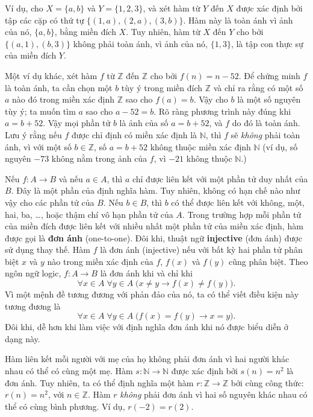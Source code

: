 \begin{example}
Ví dụ, cho $X = \{a,b\}$ và $Y = \{1,2,3\}$, và xét hàm từ $Y$ đến $X$ được xác định bởi tập các cặp có thứ tự $\{(1,a),(2,a),(3,b)\}$. Hàm này là toàn ánh vì ảnh của nó, $\{a,b\}$, bằng miền đích $X$. Tuy nhiên, hàm từ $X$ đến $Y$ cho bởi $\{(a,1),(b,3)\}$ không phải toàn ánh, vì ảnh của nó, $\{1,3\}$, là tập con thực sự của miền đích $Y$.

Một ví dụ khác, xét hàm $f$ từ $\mathbb{Z}$ đến $\mathbb{Z}$ cho bởi $f(n) = n - 52$. Để chứng minh $f$ là toàn ánh, ta cần chọn một $b$ tùy ý trong miền đích $\mathbb{Z}$ và chỉ ra rằng có một số $a$ nào đó trong miền xác định $\mathbb{Z}$ sao cho $f(a) = b$. Vậy cho $b$ là một số nguyên tùy ý; ta muốn tìm $a$ sao cho $a - 52 = b$. Rõ ràng phương trình này đúng khi $a = b + 52$. Vậy mọi phần tử $b$ là ảnh của số $a = b + 52$, và $f$ do đó là toàn ánh. Lưu ý rằng nếu $f$ được chỉ định có miền xác định là $\mathbb{N}$, thì $f$ sẽ \emph{không} phải toàn ánh, vì với một số $b \in \mathbb{Z}$, số $a = b + 52$ không thuộc miền xác định $\mathbb{N}$ (ví dụ, số nguyên $-73$ không nằm trong ảnh của $f$, vì $-21$ không thuộc $\mathbb{N}$.)
\end{example}

Nếu $f\colon A \to B$ và nếu $a \in A$, thì $a$ chỉ được liên kết với một phần tử duy nhất của $B$. Đây là một phần của định nghĩa hàm. Tuy nhiên, không có hạn chế nào như vậy cho các phần tử của $B$. Nếu $b \in B$, thì $b$ có thể được liên kết với không, một, hai, ba, \ldots, hoặc thậm chí vô hạn phần tử của $A$. Trong trường hợp mỗi phần tử của miền đích được liên kết với nhiều nhất một phần tử của miền xác định, hàm được gọi là \textbf{đơn ánh} (one-to-one). Đôi khi, thuật ngữ \textbf{injective} (đơn ánh) được sử dụng thay thế. Hàm $f$ là đơn ánh (injective) nếu với bất kỳ hai phần tử phân biệt $x$ và $y$ nào trong miền xác định của $f$, $f(x)$ và $f(y)$ cũng phân biệt. Theo ngôn ngữ logic, $f\colon A \to B$ là đơn ánh khi và chỉ khi
\[
\forall x \in A\; \forall y \in A\; \big(x \neq y \to f(x) \neq f(y)\big).
\]
Vì một mệnh đề tương đương với phản đảo của nó, ta có thể viết điều kiện này tương đương là
\[
\forall x \in A\; \forall y \in A\; \big(f(x) = f(y) \to x = y\big).
\]
Đôi khi, dễ hơn khi làm việc với định nghĩa đơn ánh khi nó được biểu diễn ở dạng này.

\begin{example}
Hàm liên kết mỗi người với mẹ của họ không phải đơn ánh vì hai người khác nhau có thể có cùng một mẹ. Hàm $s\colon \mathbb{N} \to \mathbb{N}$ được xác định bởi $s(n) = n^2$ là đơn ánh. Tuy nhiên, ta có thể định nghĩa một hàm $r\colon \mathbb{Z} \to \mathbb{Z}$ bởi cùng công thức: $r(n) = n^2$, với $n \in \mathbb{Z}$. Hàm $r$ \emph{không} phải đơn ánh vì hai số nguyên khác nhau có thể có cùng bình phương. Ví dụ, $r(-2) = r(2)$.
\end{example}

